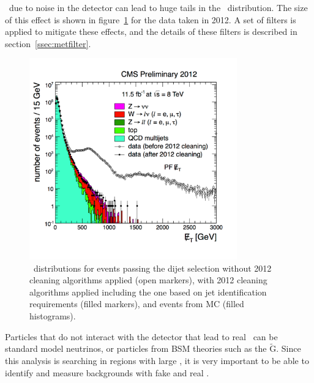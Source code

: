 \MET\ due to noise in the detector can lead to huge tails in the \MET\ distribution.
The size of this effect is shown in figure~\ref{fig:cleanmet} for the data taken in 2012.
A set of filters is applied to mitigate these effects,
and the details of these filters is described in section~\ref{ssec:metfilter}.

\begin{figure}[!ht]
  \begin{center}
    \includegraphics[width=0.8\textwidth]{MET/figs/Fig4EventCleaning.pdf}
    \caption{
      \label{fig:cleanmet}
      \MET\ distributions for events passing the dijet selection without 2012 cleaning algorithms applied (open markers),
      with 2012 cleaning algorithms applied including the one based on jet identification requirements (filled markers),
      and events from MC (filled histograms).
    }
  \end{center}
\end{figure}

Particles that do not interact with the detector that lead to real \MET\ can be standard model neutrinos, or particles from BSM theories such as the $\mathrm{\tilde{G}}$.
Since this analysis is searching in regions with large \MET, it is very important to be able to identify and measure backgrounds with fake \MET and real \MET.

